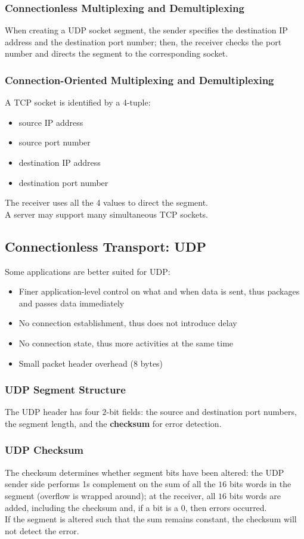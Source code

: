 \documentclass{article}
\begin{document}
\subsubsection*{Connectionless Multiplexing and Demultiplexing}
When creating a UDP socket segment, the sender specifies the destination IP address and the destination port number; then, the receiver checks the port number and directs the segment to the corresponding socket.
\subsubsection*{Connection-Oriented Multiplexing and Demultiplexing}
A TCP socket is identified by a 4-tuple:
\begin{itemize}
    \item source IP address
    \item source port number
    \item destination IP address
    \item destination port number
\end{itemize}
The receiver uses all the 4 values to direct the segment.\\
A server may support many simultaneous TCP sockets.

\subsection{Connectionless Transport: UDP}
Some applications are better suited for UDP:
\begin{itemize}
    \item Finer application-level control on what and when data is sent, thus packages and passes data immediately
    \item No connection establishment, thus does not introduce delay
    \item No connection state, thus more activities at the same time
    \item Small packet header overhead ($8$ bytes)
\end{itemize}
\subsubsection{UDP Segment Structure}
The UDP header has four $2$-bit fields: the source and destination port numbers, the segment length, and the \textbf{checksum} for error detection.
\subsubsection{UDP Checksum}
The checksum determines whether segment bits have been altered: the UDP sender side performs 1s complement on the sum of all the $16$ bits words in the segment (overflow is wrapped around); at the receiver, all $16$ bits words are added, including the checksum and, if a bit is a $0$, then errors occurred. \\
If the segment is altered such that the sum remains constant, the checksum will not detect the error.
\end{document}
